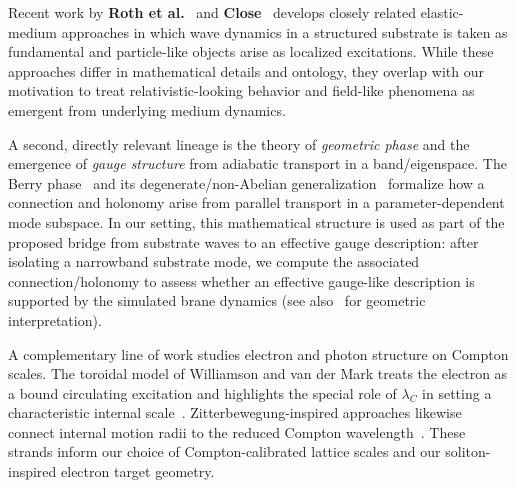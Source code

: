 Recent work by \textbf{Roth et al.}~\cite{Roth2023QQM2} and \textbf{Close}~\cite{Close2025EquationEverything}
develops closely related elastic-medium approaches in which wave dynamics in a structured substrate
is taken as fundamental and particle-like objects arise as localized excitations. While these
approaches differ in mathematical details and ontology, they overlap with our motivation to treat
relativistic-looking behavior and field-like phenomena as emergent from underlying medium dynamics.

A second, directly relevant lineage is the theory of \emph{geometric phase} and the emergence of
\emph{gauge structure} from adiabatic transport in a band/eigenspace. The Berry phase~\cite{Berry1984}
and its degenerate/non-Abelian generalization~\cite{WilczekZee1984} formalize how a connection and
holonomy arise from parallel transport in a parameter-dependent mode subspace. In our setting, this
mathematical structure is used as part of the proposed bridge from substrate waves to an effective gauge description: after isolating a narrowband substrate mode, we
compute the associated connection/holonomy to assess whether an effective gauge-like description is
supported by the simulated brane dynamics (see also~\cite{Katanaev2009} for geometric interpretation).

A complementary line of work studies electron and photon structure on Compton scales. The toroidal
model of Williamson and van der Mark treats the electron as a bound circulating excitation and
highlights the special role of $\lambda_C$ in setting a characteristic internal scale~\cite{Williamson1997,Williamson2015}.
Zitterbewegung-inspired approaches likewise connect internal motion radii to the reduced Compton
wavelength~\cite{UrdanetaSantos2023}. These strands inform our choice of Compton-calibrated lattice
scales and our soliton-inspired electron target geometry.